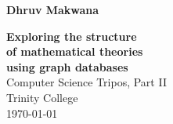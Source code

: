 \pagestyle{empty}

\hfill{\Large \sffamily \bfseries Dhruv Makwana}

\vspace*{60mm}
\begin{center}
\Huge
{\sf \bfseries Exploring the structure \\ of mathematical theories \\ using graph databases} \\
\vspace*{5mm}
Computer Science Tripos, Part II \\
\vspace*{5mm}
Trinity College \\
\vspace*{5mm}
\today
\end{center}
